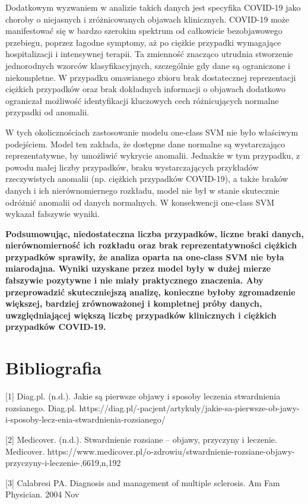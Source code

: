 \documentclass[a4paper,fleqn]{cas-dc}
\begin{document}
Dodatkowym wyzwaniem w analizie takich danych jest specyfika COVID-19 jako choroby o niejasnych i zróżnicowanych objawach klinicznych. COVID-19 może manifestować się w bardzo szerokim spektrum od całkowicie bezobjawowego przebiegu, poprzez łagodne symptomy, aż po ciężkie przypadki wymagające hospitalizacji i intensywnej terapii. Ta zmienność znacząco utrudnia stworzenie jednorodnych wzorców klasyfikacyjnych, szczególnie gdy dane są ograniczone i niekompletne. W przypadku omawianego zbioru brak dostatecznej reprezentacji ciężkich przypadków oraz brak dokładnych informacji o objawach dodatkowo ograniczał możliwość identyfikacji kluczowych cech różnicujących normalne przypadki od anomalii.

W tych okolicznościach zastosowanie modelu one-class SVM nie było właściwym podejściem. Model ten zakłada, że dostępne dane normalne są wystarczająco reprezentatywne, by umożliwić wykrycie anomalii. Jednakże w tym przypadku, z powodu małej liczby przypadków, braku wystarczających przykładów rzeczywistych anomalii (np. ciężkich przypadków COVID-19), a także braków danych i ich nierównomiernego rozkładu, model nie był w stanie skutecznie odróżnić anomalii od danych normalnych. W konsekwencji one-class SVM wykazał fałszywie wyniki.

\textbf{Podsumowując, niedostateczna liczba przypadków, liczne braki danych, nierównomierność ich rozkładu oraz brak reprezentatywności ciężkich przypadków sprawiły, że analiza oparta na one-class SVM nie była miarodajna. Wyniki uzyskane przez model były w dużej mierze fałszywie pozytywne i nie miały praktycznego znaczenia. Aby przeprowadzić skuteczniejszą analizę, konieczne byłoby zgromadzenie większej, bardziej zrównoważonej i kompletnej próby danych, uwzględniającej większą liczbę przypadków klinicznych i ciężkich przypadków COVID-19.}

\section{Bibliografia}

[1] Diag.pl. (n.d.). Jakie są pierwsze objawy i sposoby leczenia stwardnienia rozsianego. Diag.pl. https://diag.pl/-pacjent/artykuly/jakie-sa-pierwsze-ob-jawy-i-sposoby-lecz-enia-stwardnienia-rozsianego/

[2] Medicover. (n.d.). Stwardnienie rozsiane – objawy, przyczyny i leczenie. Medicover. https://www.medicover.pl/o-zdrowiu/stwardnienie-rozsiane-objawy-przyczyny-i-leczenie-,6619,n,192

[3] Calabresi PA. Diagnosis and management of multiple sclerosis. Am Fam Physician. 2004 Nov
\end{document}

